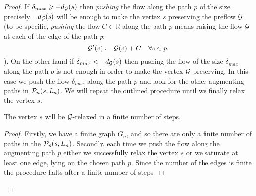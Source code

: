 \documentclass[12pt]{article}
\begin{document}
\begin{proof}
      If $\delta_{max} \geq -d_{\cal{G}}(s)$ then \emph{pushing} the flow along the path $p$ of the size precisely $-d_{\cal{G}}(s)$
        will be enough to make the vertex $s$ preserving the preflow $\cal{G}$
        (to be specific, \emph{pushing} the flow $C \in \mathbb{R}$ along the path $p$ means raising the flow $\cal{G}$ at each of the edge of
        the path $p$:
      \[
        \cal{G}'(e) := \cal{G}(e) + C \quad \forall e \in p.
      \]).
      On the other hand if $\delta_{max} < -d_{\cal{G}}(s)$ then pushing the flow of the size $\delta_{max}$ along the path $p$ is not enough
        in order to make the vertex $\cal{G}$-preserving.
      In this case we push the flow $\delta_{max}$ along the path $p$ and look for the other augmenting paths in $\gnpaths(s, L_n)$.
      We will repeat the outlined procedure until we finally relax the vertex $s$.
      \begin{prop}
        The vertex $s$ will be $\cal{G}$-relaxed in a finite number of steps.
      \end{prop}
      \begin{proof}
        Firstly, we have a finite graph $G_{n}$, and so there are only a finite number of paths in the $\gnpaths(s, L_n)$.
        Secondly, each time we push the flow along the augmenting path $p$ either we successfully relax the vertex $s$
          or we saturate at least one edge, lying on the chosen path $p$.
        Since the number of the edges is finite the procedure halts after a finite number of steps.


\end{proof}
\end{proof}
\end{document}
